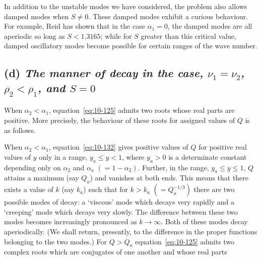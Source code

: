 In addition to the unstable modes we have considered, the problem also allows damped modes when $S \neq 0$. These damped modes exhibit a curious behaviour. For example, Reid has shown that in the case $\alpha_1 = 0$, the damped modes are all aperiodic so long as $S < 1.3165$; while for $S$ greater than this critical value, damped oscillatory modes become possible for certain ranges of the wave number.


\subsection*{(d) \textit{The manner of decay in the case, $\nu_1 = \nu_2$, $\rho_2 < \rho_1$, and $S = 0$}}

When $\alpha_2 < \alpha_1$, equation~\eqref{eq:10-125} admits two roots whose real parts are positive. More precisely, the behaviour of these roots for assigned values of $Q$ is as follows.

When $\alpha_2 < \alpha_1$, equation~\eqref{eq:10-132} gives positive values of $Q$ for positive real values of $y$ only in a range, $y_a \leqslant y < 1$, where $y_a > 0$ is a determinate constant depending only on $\alpha_2$ and $\alpha_a$ $(= 1-\alpha_2)$. Further, in the range, $y_a \leqslant y \leqslant 1$, $Q$ attains a maximum (say $Q_a$) and vanishes at both ends. This means that there exists a value of $k$ (say $k_a$) such that for $k > k_a$ $(= Q_a^{-1/3})$ there are two possible modes of decay: a `viscous' mode which decays very rapidly and a `creeping' mode which decays very slowly. The difference between these two modes becomes increasingly pronounced as $k \to \infty$. Both of these modes decay aperiodically. (We shall return, presently, to the difference in the proper functions belonging to the two modes.) For $Q > Q_a$ equation~\eqref{eq:10-125} admits two complex roots which are conjugates of one another and whose real parts


